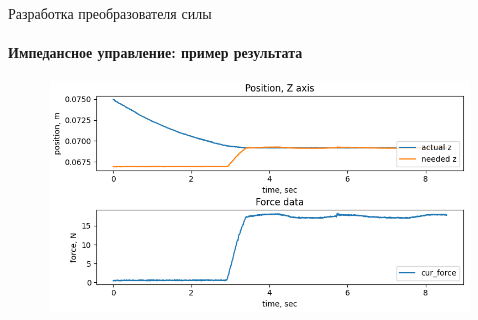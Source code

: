 \documentclass[aspectratio=169,xcolor=table]{beamer}
\begin{document}
\begin{frame}[t]{Разработка преобразователя силы}
    \framesubtitle{Импедансное управление: пример результата}
    \vspace{-15pt}
    \begin{figure}[H]
        \centering\includegraphics[height=6.1cm,width=1\textwidth,keepaspectratio]{force_data_pos.png}
        \label{fig:impedance}
    \end{figure}
\end{frame}
\end{document}

